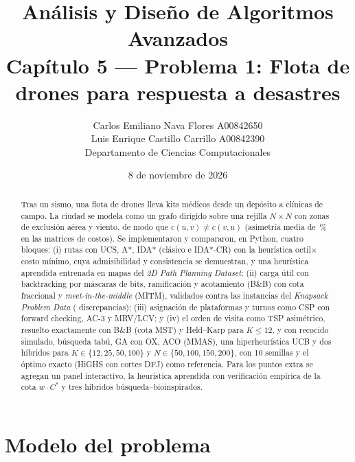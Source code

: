 \documentclass[11pt]{article}
\title{\textbf{Análisis y Diseño de Algoritmos Avanzados}\\[0.2cm]
\large Capítulo 5 --- Problema 1: Flota de drones para respuesta a desastres}
\author{Carlos Emiliano Nava Flores \quad A00842650\\
Luis Enrique Castillo Carrillo \quad A00842390\\[0.15cm]
Departamento de Ciencias Computacionales}
\date{8 de noviembre de 2026}
\theoremstyle{remark}
\begin{document}
\maketitle

\begin{abstract}
\noindent
Tras un sismo, una flota de drones lleva kits médicos desde un depósito a clínicas de campo.
La ciudad se modela como un grafo dirigido sobre una rejilla $N\times N$ con zonas de exclusión
aérea y viento, de modo que $c(u,v)\neq c(v,u)$ (asimetría media de \asimMedia\,\% en las matrices
de costos). Se implementaron y compararon, en Python, cuatro bloques: (i) rutas con UCS, A*, IDA*
(clásico e IDA*-CR) con la heurística octil$\times$costo mínimo, cuya admisibilidad y consistencia se
demuestran, y una heurística aprendida entrenada en mapas del \emph{2D Path Planning Dataset};
(ii) carga útil con backtracking por máscaras de bits, ramificación y acotamiento (B\&B) con cota
fraccional y \emph{meet-in-the-middle} (MITM), validados contra las \kagInst{} instancias del
\emph{Knapsack Problem Data} (\kagDisc{} discrepancias); (iii) asignación de plataformas y turnos
como CSP con forward checking, AC-3 y MRV/LCV; y (iv) el orden de visita como TSP asimétrico,
resuelto exactamente con B\&B (cota MST) y Held--Karp para $K\le 12$, y con recocido simulado,
búsqueda tabú, GA con OX, ACO (MMAS), una hiperheurística UCB y dos híbridos para
$K\in\{12,25,50,100\}$ y $N\in\{50,100,150,200\}$, con 10 semillas y el óptimo exacto (HiGHS con
cortes DFJ) como referencia. Para los puntos extra se agregan un panel interactivo, la heurística
aprendida con verificación empírica de la cota $w\cdot C^*$ y tres híbridos búsqueda--bioinspirados.
\end{abstract}

\tableofcontents

\section{Modelo del problema}
\end{document}
